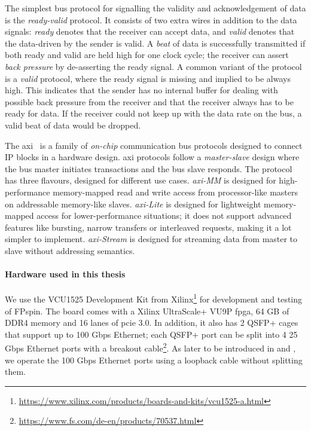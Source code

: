 The simplest bus protocol for signalling the validity and acknowledgement of data is the \emph{ready-valid} protocol.  It consists of two extra wires in addition to the data signals: \emph{ready} denotes that the receiver can accept data, and \emph{valid} denotes that the data-driven by the sender is valid.  A \emph{beat} of data is successfully transmitted if both ready and valid are held high for one clock cycle; the receiver can assert \emph{back pressure} by de-asserting the ready signal.  A common variant of the protocol is a \emph{valid} protocol, where the ready signal is missing and implied to be always high.  This indicates that the sender has no internal buffer for dealing with possible back pressure from the receiver and that the receiver always has to be ready for data.  If the receiver could not keep up with the data rate on the bus, a valid beat of data would be dropped.

The \ac{axi}~\cite{arm_limited_amba_2003, arm_limited_amba_2010} is a family of \emph{on-chip} communication bus protocols designed to connect IP blocks in a hardware design.  \ac{axi} protocols follow a \emph{master-slave} design where the bus master initiates transactions and the bus slave responds.  The protocol has three flavours, designed for different use cases.  \emph{\ac{axi}-MM} is designed for high-performance memory-mapped read and write access from processor-like masters on addressable memory-like slaves.  \emph{\ac{axi}-Lite} is designed for lightweight memory-mapped access for lower-performance situations; it does not support advanced features like bursting, narrow transfers or interleaved requests, making it a lot simpler to implement.  \emph{\ac{axi}-Stream} is designed for streaming data from master to slave without addressing semantics.

\paragraph{Hardware used in this thesis} We use the VCU1525 Development Kit from Xilinx\footnote{\url{https://www.xilinx.com/products/boards-and-kits/vcu1525-a.html}} for development and testing of FP\acs{spin}.  The board comes with a Xilinx UltraScale+ VU9P \ac{fpga}, 64 GB of DDR4 memory and 16 lanes of \ac{pcie} 3.0.  In addition, it also has 2 QSFP+ cages that support up to 100 Gbps Ethernet; each QSFP+ port can be split into 4 25 Gbps Ethernet ports with a breakout cable\footnote{\url{https://www.fs.com/de-en/products/70537.html}}.  As later to be introduced in  and , we operate the 100 Gbps Ethernet ports using a loopback cable without splitting them.

